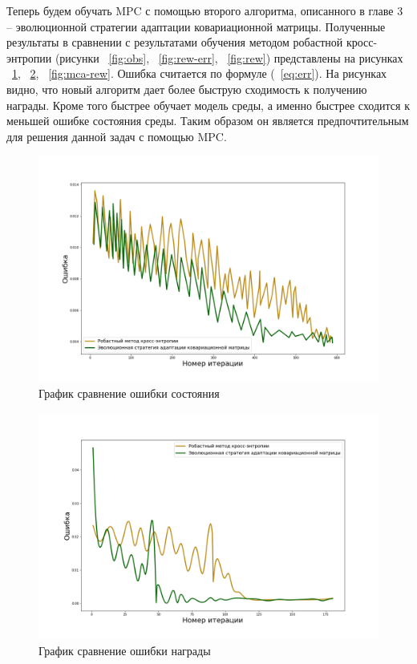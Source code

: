 Теперь будем обучать MPC с помощью второго алгоритма, описанного в главе 3 -- эволюционной стратегии адаптации ковариационной матрицы. Полученные результаты в сравнении с результатами обучения методом робастной кросс-энтропии (рисунки ~\ref{fig:obs}, ~\ref{fig:rew-err}, ~\ref{fig:rew}) представлены на рисунках ~\ref{fig:mca-obs}, ~\ref{fig:mca-rew-err}, ~\ref{fig:mca-rew}. Ошибка считается по формуле (~\ref{eq:err}). На рисунках видно, что новый алгоритм дает более быструю сходимость к получению награды. Кроме того быстрее обучает модель среды, а именно быстрее сходится к меньшей ошибке состояния среды. Таким образом он является предпочтительным для решения данной задач с помощью MPC. \newpage

\begin{figure}[!h]
	\centering
	\includegraphics[scale=0.44]{mca_obs.png}
	\caption {График сравнение ошибки состояния}
	\label{fig:mca-obs}
\end{figure}



\begin{figure}[!h]
	\centering
	\includegraphics[scale=0.44]{mca_rew_err.png}
	\caption {График сравнение ошибки награды}
	\label{fig:mca-rew-err}
\end{figure}



